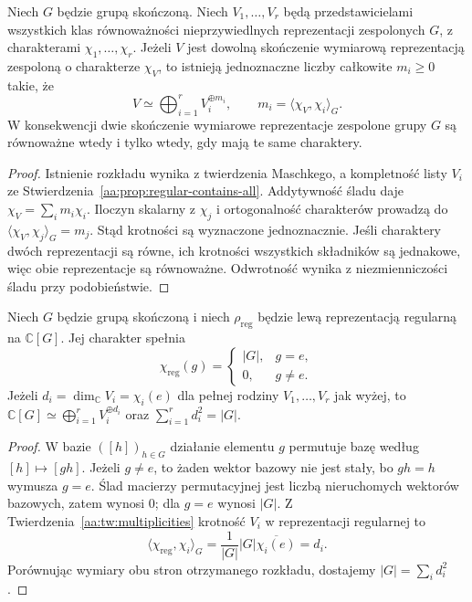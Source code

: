 \begin{twierdzenie}
\label{aa:tw:multiplicities}
Niech \(G\) będzie grupą skończoną.
Niech \(V_1,\ldots,V_r\) będą przedstawicielami
wszystkich klas równoważności nieprzywiedlnych
reprezentacji zespolonych \(G\), z charakterami
\(\chi_1,\ldots,\chi_r\). Jeżeli \(V\) jest dowolną
skończenie wymiarową reprezentacją zespoloną
o charakterze \(\chi_V\), to istnieją jednoznaczne
liczby całkowite \(m_i\ge0\) takie, że
\[
V\simeq\bigoplus_{i=1}^r V_i^{\oplus m_i},
\qquad m_i=\langle\chi_V,\chi_i\rangle_G.
\]
W konsekwencji dwie skończenie wymiarowe reprezentacje
zespolone grupy \(G\) są równoważne wtedy i tylko
wtedy, gdy mają te same charaktery.
\end{twierdzenie}
\begin{proof}
Istnienie rozkładu wynika z twierdzenia Maschkego,
a kompletność listy \(V_i\) ze
Stwierdzenia~\ref{aa:prop:regular-contains-all}.
Addytywność śladu daje
\(\chi_V=\sum_i m_i\chi_i\).
Iloczyn skalarny z \(\chi_j\) i ortogonalność
charakterów prowadzą do
\(\langle\chi_V,\chi_j\rangle_G=m_j\).
Stąd krotności są wyznaczone jednoznacznie.
Jeśli charaktery dwóch reprezentacji są równe,
ich krotności wszystkich składników są jednakowe,
więc obie reprezentacje są równoważne.
Odwrotność wynika z niezmienniczości śladu
przy podobieństwie.
\end{proof}

\begin{twierdzenie}
\label{aa:tw:regular-character}
Niech \(G\) będzie grupą skończoną i niech
\(\rho_{\mathrm{reg}}\) będzie lewą reprezentacją
regularną na \(\mathbb C[G]\). Jej charakter spełnia
\[
\chi_{\mathrm{reg}}(g)=
\begin{cases}|G|,&g=e,\\0,&g\ne e.\end{cases}
\]
Jeżeli \(d_i=\dim_{\mathbb C}V_i=\chi_i(e)\)
dla pełnej rodziny \(V_1,\ldots,V_r\) jak wyżej,
to \(\mathbb C[G]\simeq\bigoplus_{i=1}^r
V_i^{\oplus d_i}\) oraz
\(\sum_{i=1}^r d_i^2=|G|\).
\end{twierdzenie}
\begin{proof}
W bazie \(([h])_{h\in G}\) działanie elementu \(g\)
permutuje bazę według \([h]\mapsto[gh]\).
Jeżeli \(g\ne e\), to żaden wektor bazowy nie
jest stały, bo \(gh=h\) wymusza \(g=e\).
Ślad macierzy permutacyjnej jest liczbą
nieruchomych wektorów bazowych, zatem wynosi \(0\);
dla \(g=e\) wynosi \(|G|\).
Z Twierdzenia~\ref{aa:tw:multiplicities} krotność
\(V_i\) w reprezentacji regularnej to
\[
\langle\chi_{\mathrm{reg}},\chi_i\rangle_G
=\frac1{|G|}|G|\overline{\chi_i(e)}=d_i.
\]
Porównując wymiary obu stron otrzymanego rozkładu,
dostajemy \(|G|=\sum_i d_i^2\).
\end{proof}

